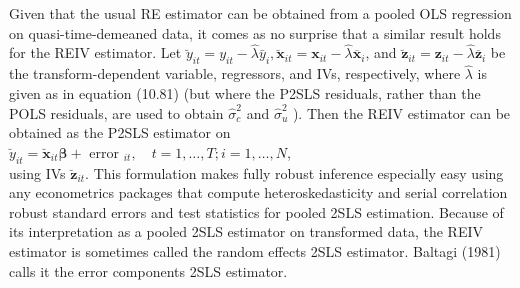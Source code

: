 \documentclass[10pt]{article}
\begin{document}
Given that the usual RE estimator can be obtained from a pooled OLS regression on quasi-time-demeaned data, it comes as no surprise that a similar result holds for the REIV estimator. Let $\breve{y}_{i t}=y_{i t}-\hat{\lambda} \bar{y}_{i}, \breve{\mathbf{x}}_{i t}=\mathbf{x}_{i t}-\hat{\lambda} \overline{\mathbf{x}}_{i}$, and $\breve{\mathbf{z}}_{i t}=\mathbf{z}_{i t}-\hat{\lambda} \overline{\mathbf{z}}_{i}$ be the transform-dependent variable, regressors, and IVs, respectively, where $\hat{\lambda}$ is given as in equation (10.81) (but where the P2SLS residuals, rather than the POLS residuals, are used to obtain $\hat{\sigma}_{c}^{2}$ and $\hat{\sigma}_{u}^{2}$ ). Then the REIV estimator can be obtained as the P2SLS estimator on\\
$\breve{y}_{i t}=\breve{\mathbf{x}}_{i t} \boldsymbol{\beta}+$ error $_{i t}, \quad t=1, \ldots, T ; i=1, \ldots, N$,\\
using IVs $\breve{\mathbf{z}}_{i t}$. This formulation makes fully robust inference especially easy using any econometrics packages that compute heteroskedasticity and serial correlation robust standard errors and test statistics for pooled 2SLS estimation. Because of its interpretation as a pooled 2SLS estimator on transformed data, the REIV estimator is sometimes called the random effects 2SLS estimator. Baltagi (1981) calls it the error components 2SLS estimator.
\end{document}
